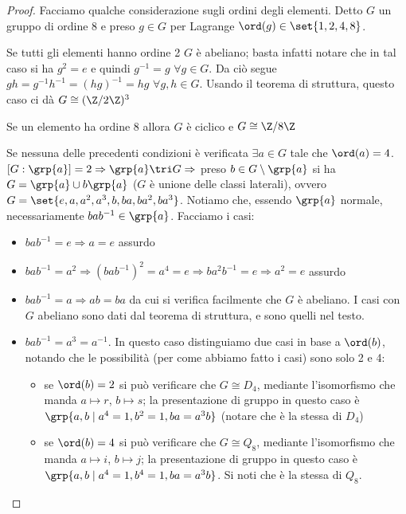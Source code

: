 \begin{proof}
    Facciamo qualche considerazione sugli ordini degli elementi. Detto $G$ un gruppo di ordine 8 e preso $g \in G$ per Lagrange $\ord(g) \in \set{1,2,4,8}$. 
    
    Se tutti gli elementi hanno ordine 2 $G$ è abeliano; basta infatti notare che in tal caso si ha $g^2 = e$ e quindi $g^{-1} = g$ $\forall g \in G$. Da ciò segue $gh = g^{-1}h^{-1} = (hg)^{-1} = hg$ $\forall g,h\in G$. Usando il teorema di struttura, questo caso ci dà $G \cong (\Z/2\Z)^3$
    
    Se un elemento ha ordine 8 allora $G$ è ciclico e $G \cong \Z/8\Z$

    Se nessuna delle precedenti condizioni è verificata $\exists a \in G$ tale che $\ord(a) = 4$. $[G : \grp{a}] = 2 \Rightarrow \grp{a} \tri G \Rightarrow$ preso $b \in G \setminus \grp{a}$ si ha $G = \grp{a} \cup b\grp{a}$ ($G$ è unione delle classi laterali), ovvero $G = \set{e,a,a^2,a^3,b,ba,ba^2,ba^3}$. Notiamo che, essendo $\grp{a}$ normale, necessariamente $bab^{-1} \in \grp{a}$. Facciamo i casi:
    \begin{itemize}
        \item $bab^{-1} = e \Rightarrow a =e$ assurdo
        \item $bab^{-1} = a^2 \Rightarrow (bab^{-1})^2 = a^4 = e \Rightarrow ba^2b^{-1} = e \Rightarrow a^2 = e$ assurdo
        \item $bab^{-1} = a \Rightarrow ab = ba$ da cui si verifica facilmente che $G$ è abeliano. I casi con $G$ abeliano sono dati dal teorema di struttura, e sono quelli nel testo. 
        \item $bab^{-1} = a^3 = a^{-1}$. In questo caso distinguiamo due casi in base a $\ord(b)$, notando che le possibilità (per come abbiamo fatto i casi) sono solo 2 e 4:
        \begin{itemize}
            \item se $\ord(b) = 2$ si può verificare che $G \cong D_4$, mediante l'isomorfismo che manda $a \mapsto r$, $b \mapsto s$; la presentazione di gruppo in questo caso è $\grp{a,b \mid a^4 = 1, b^2= 1, ba = a^3b}$ (notare che è la stessa di $D_4$)
            \item se $\ord(b) = 4$ si può verificare che $G \cong Q_8$, mediante l'isomorfismo che manda $a \mapsto i$, $b \mapsto j$; la presentazione di gruppo in questo caso è $\grp{a,b \mid a^4 = 1, b^4= 1, ba = a^3b}$. Si noti che è la stessa di $Q_8$.
        \end{itemize}
    \end{itemize}
\end{proof}

